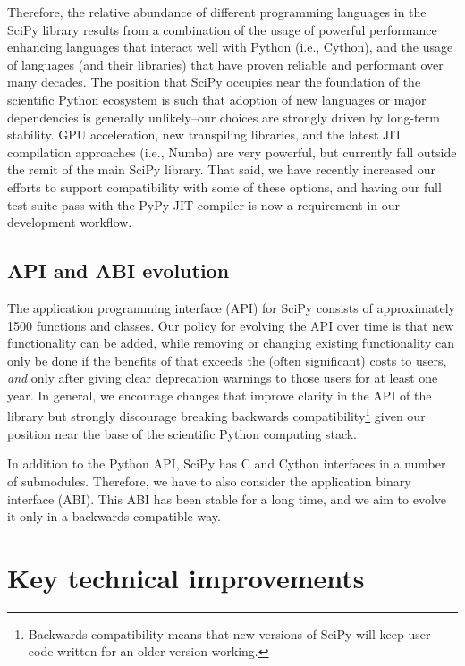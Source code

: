 \documentclass[fleqn,10pt]{wlscirep}
\begin{document}
Therefore, the relative abundance of different programming languages
in the SciPy library results from a combination of the usage of powerful performance
enhancing languages that interact well with Python (i.e., Cython), and
the usage of languages (and their libraries) that have proven reliable
and performant over many decades. The position that SciPy occupies
near the foundation of the scientific Python ecosystem is such that
adoption of new languages or major dependencies is generally unlikely--our
choices are strongly driven by long-term stability. GPU acceleration,
new transpiling libraries, and the latest JIT compilation approaches
(i.e., Numba\cite{Lam:2015:NLP:2833157.2833162}) are very powerful, but currently fall outside the remit
of the main SciPy library. That said, we have recently increased our
efforts to support compatibility with some of these options, and having
our full test suite pass with the PyPy JIT compiler\cite{Bolz:2009:TMP:1565824.1565827}
is now a requirement in our development workflow.

\subsection*{API and ABI evolution}
The application programming interface (API) for SciPy consists of
approximately 1500 functions and classes.
Our policy for evolving the API over time is that new functionality can be added,
while removing or changing existing functionality can only be done if the benefits
of that exceeds the (often significant) costs to users, \textit{and} only
after giving clear deprecation warnings to those users for at least one year.
In general, we encourage changes that improve clarity in the API of the
library but strongly discourage breaking backwards compatibility\footnote{
    Backwards compatibility means that new versions of SciPy will keep user
    code written for an older version working.}
given our position near the base of the scientific Python computing stack.

In addition to the Python API, SciPy has C and Cython interfaces in a number
of submodules. Therefore, we have to also consider the application binary
interface (ABI). This ABI has been stable for a long time, and we aim to
evolve it only in a backwards compatible way.

\section*{Key technical improvements}
\end{document}

